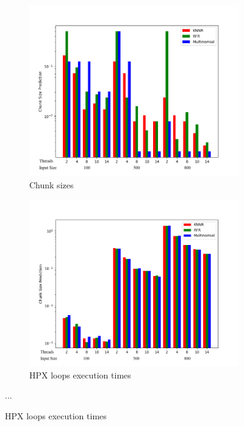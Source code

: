 \documentclass[12pt]{article}
\begin{document}
\begin{figure}[h]
	\centering
	\begin{subfigure}[b]{0.5\textwidth}
		\centering
		\includegraphics[width=\textwidth]{images/matrix_mult_corrected_predictions_bar.png}
		\caption[Network2]%
		{{Chunk sizes}}    
	\end{subfigure}
	\hfill
	\begin{subfigure}[b]{0.49\textwidth}  
		\centering 
		\includegraphics[width=\textwidth]{images/matrix_mult_corrected_times_bar.png}
		\caption[]%
		{{HPX loops execution times}}    
	\end{subfigure}
	{...} 
	
\end{figure}
\end{document}
